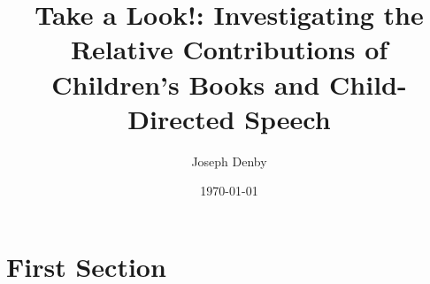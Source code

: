 \documentclass{beamer}
\title[Take a Look!]{Take a Look!: Investigating the Relative Contributions of Children's Books and Child-Directed Speech} %
\author{Joseph Denby} %
\institute[] %
{
Computational Content Analysis \\ %
\medskip
}
\date{\today} %
\begin{document}
\begin{frame}
\titlepage %
\end{frame}



\section{First Section} %



\end{document}
